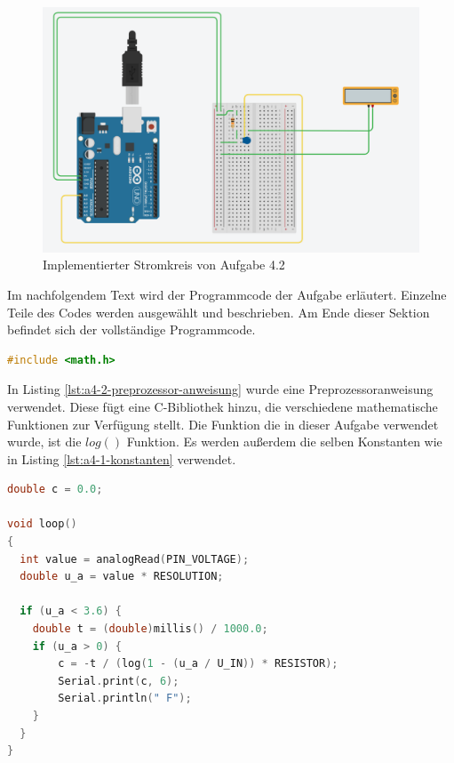 \begin{figure}
    \centering
    \includegraphics[width=\textwidth]{pictures/a4-2-pratik.png}
    \caption{Implementierter Stromkreis von Aufgabe 4.2}
    \label{fig:implementierung-aufgabe-4-2}
\end{figure}

Im nachfolgendem Text wird der Programmcode der Aufgabe erläutert.
Einzelne Teile des Codes werden ausgewählt und beschrieben.
Am Ende dieser Sektion befindet sich der vollständige Programmcode.

\begin{lstlisting}[language=C,label={lst:a4-2-preprozessor-anweisung}, caption={Preprozessoranweisung}]
#include <math.h>
\end{lstlisting}

In Listing \ref{lst:a4-2-preprozessor-anweisung} wurde eine Preprozessoranweisung verwendet.
Diese fügt eine C-Bibliothek hinzu, die verschiedene mathematische Funktionen zur Verfügung stellt.
Die Funktion die in dieser Aufgabe verwendet wurde, ist die $log()$ Funktion.
Es werden außerdem die selben Konstanten wie in Listing \ref{lst:a4-1-konstanten} verwendet.

\begin{lstlisting}[language=C,label={lst:a4-2-programloop}, caption={Programmschleife}]
double c = 0.0;

void loop()
{
  int value = analogRead(PIN_VOLTAGE);
  double u_a = value * RESOLUTION;

  if (u_a < 3.6) {
    double t = (double)millis() / 1000.0;
    if (u_a > 0) {
    	c = -t / (log(1 - (u_a / U_IN)) * RESISTOR);
        Serial.print(c, 6);
        Serial.println(" F");
    }
  }
}
\end{lstlisting}

